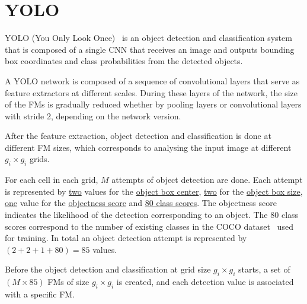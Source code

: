 \section{YOLO}
YOLO (You Only Look
Once)~\cite{Yolov1_DBLP:journals/corr/RedmonDGF15,Yolov2_redmon2016yolo9000,yolov3}
is an object detection and classification system that is composed of a single
CNN that receives an image and outputs bounding box coordinates and class
probabilities from the detected objects.

A YOLO network is composed of a sequence of convolutional layers that serve as
feature extractors at different scales. During these layers of the network, the
size of the FMs is gradually reduced whether by pooling layers or convolutional
layers with stride 2, depending on the network version.

After the feature extraction, object detection and classification is done at
different FM sizes, which corresponds to analysing the input image at different
$g_i \times g_i$ grids.

For each cell in each grid, $M$ attempts of object detection are done. Each
attempt is represented by \underline{two} values for the \underline{object box
  center}, \underline{two} for the \underline{object box size}, \underline{one}
value for the \underline{objectness score} and \underline{80 class scores}. The
objectness score indicates the likelihood of the detection corresponding to an
object. The 80 class scores correspond to the number of existing classes in the
COCO dataset~\cite{coco:Microsoft} used for training. In total an object
detection attempt is represented by $(2+2+1+80) = 85$ values.

Before the object detection and classification at grid size $g_i \times g_i$
starts, a set of $(M \times 85)$ FMs of size $ g_i \times g_i$ is created, and
each detection value is associated with a specific FM.




